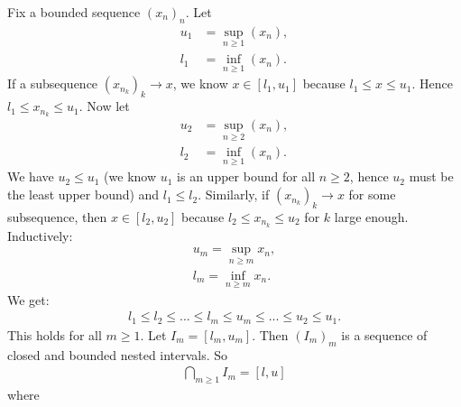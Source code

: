     \begin{example}
        Fix a bounded sequence $(x_n)_n$. Let
            \begin{equation*}
            \begin{split}
                u_1 &= \sup_{n \geq 1}(x_n), \\
                l_1 &= \inf_{n \geq 1}(x_n).
            \end{split}
            \end{equation*}
        If a subsequence $(x_{n_k})_k \rightarrow x$, we know $x \in [l_1,u_1]$ because $l_1 \leq x \leq u_1$. Hence $l_1 \leq x_{n_k} \leq u_1$. Now let
            \begin{equation*}
            \begin{split}
                u_2 &= \sup_{n \geq 2}(x_n), \\
                l_2 &= \inf_{n \geq 1}(x_n).
            \end{split}
            \end{equation*}
        We have $u_2 \leq u_1$ (we know $u_1$ is an upper bound for all $n \geq 2$, hence $u_2$ must be the least upper bound) and $l_1 \leq l_2$. Similarly, if $(x_{n_k})_k \rightarrow x$ for some subsequence, then $x \in [l_2, u_2]$ because $l_2 \leq x_{n_k} \leq u_2$ for $k$ large enough. Inductively:
            \begin{equation*}
            \begin{split}
                u_m = \sup_{n \geq m} x_n, \\
                l_m = \inf_{n \geq m } x_n.
            \end{split}
            \end{equation*}
        We get:
            \begin{equation*}
            \begin{split}
                l_1 \leq l_2 \leq ... \leq l_m \leq u_m \leq ... \leq u_2 \leq u_1 .
            \end{split}
            \end{equation*}
        This holds for all $m \geq 1$. Let $I_m = [l_m, u_m]$. Then $(I_m)_m$ is a sequence of closed and bounded nested intervals. So
            \begin{equation*}
            \begin{split}
                \bigcap_{m\geq 1} I_m = [l,u]
            \end{split}
            \end{equation*}
        where
            \begin{equation*}

\end{equation*}
\end{example}
